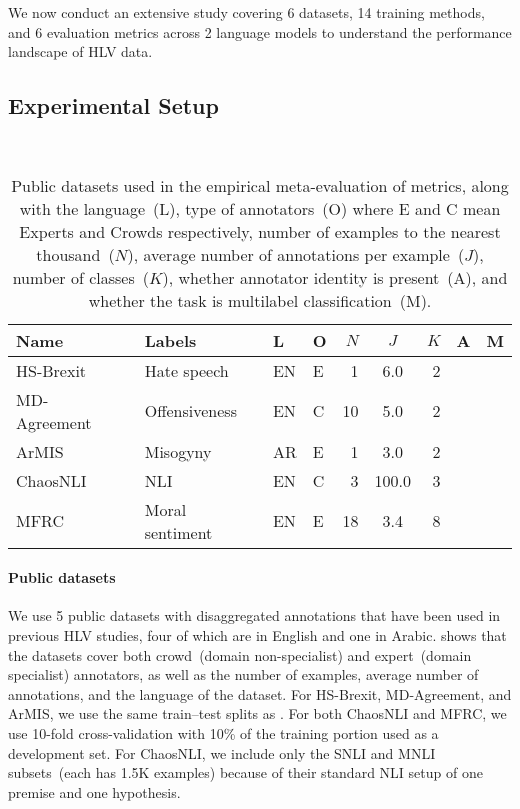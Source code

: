 \documentclass[shortpaper]{clv2025}
\newcommand{\yes}{\textcolor{green}{\ding{51}}\xspace}
\newcommand{\no}{\textcolor{red}{\ding{55}}\xspace}
\begin{document}
We now conduct an extensive study covering 6 datasets, 14 training methods, and 6
evaluation metrics across 2 language models to understand the performance
landscape of HLV data.

\subsection{Experimental Setup}

\begin{table}\footnotesize
  \caption{Public datasets used in the empirical meta-evaluation of metrics,
    along with the language~(L), type of annotators~(O) where E and C mean
    Experts and Crowds respectively, number of examples to the nearest
    thousand~($N$), average number of annotations per example~($J$), number of
    classes~($K$), whether annotator identity is present~(A), and whether the
    task is multilabel classification~(M).}~\label{tbl:datasets}
  \begin{tabular}{@{}llllrSrcc@{}}
    \toprule
    Name                                 & Labels          & L  & O & $N$ & $J$   & $K$ & A    & M    \\
    \midrule
    HS-Brexit~\citep{akhtar2021a}        & Hate speech     & EN & E & 1   & 6.0   & 2   & \yes & \no  \\
    MD-Agreement~\citep{leonardelli2021} & Offensiveness   & EN & C & 10  & 5.0   & 2   & \yes & \no  \\
    ArMIS~\citep{almanea2022}            & Misogyny        & AR & E & 1   & 3.0   & 2   & \yes & \no  \\
    ChaosNLI~\citep{nie2020}             & NLI             & EN & C & 3   & 100.0 & 3   & \no  & \no  \\
    MFRC~\citep{trager2022a}             & Moral sentiment & EN & E & 18  & 3.4   & 8   & \yes & \yes \\
    \bottomrule
  \end{tabular}
\end{table}

\paragraph{Public datasets}

We use 5 public datasets with disaggregated annotations that have been used in
previous HLV studies, four of which are in English and one in Arabic.
 shows that the datasets cover both crowd~(domain
non-specialist) and expert~(domain specialist) annotators, as well as the number
of examples, average number of annotations, and the language of the dataset. For
HS-Brexit, MD-Agreement, and ArMIS, we use the same train--test splits as
\citet{leonardelli2023}. For both ChaosNLI and MFRC, we use 10-fold
cross-validation with 10\% of the training portion used as a development set.
For ChaosNLI, we include only the SNLI and MNLI subsets~(each has 1.5K examples)
because of their standard NLI setup of one premise and one hypothesis.
\end{document}
